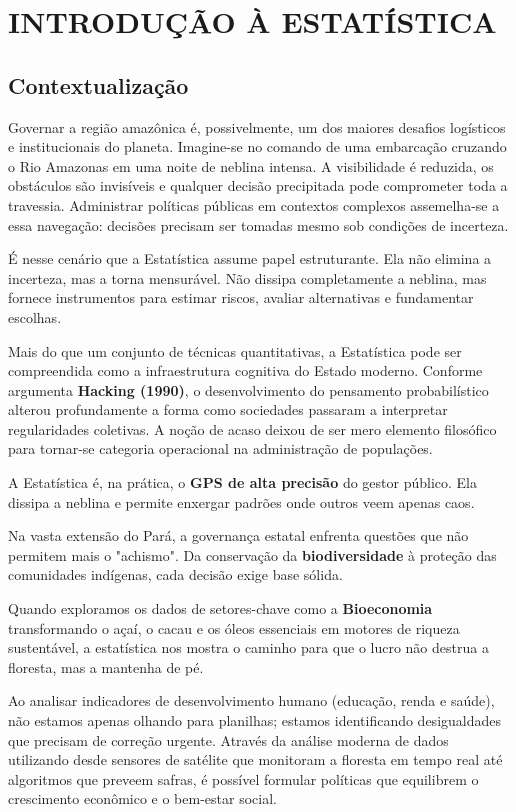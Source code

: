 \chapter{INTRODUÇÃO À ESTATÍSTICA}
\section{Contextualização}

Governar a região amazônica é, possivelmente, um dos maiores desafios logísticos e institucionais do planeta. Imagine-se no comando de uma embarcação cruzando o Rio Amazonas em uma noite de neblina intensa. A visibilidade é reduzida, os obstáculos são invisíveis e qualquer decisão precipitada pode comprometer toda a travessia. Administrar políticas públicas em contextos complexos assemelha-se a essa navegação: decisões precisam ser tomadas mesmo sob condições de incerteza. \vskip0.3cm

É nesse cenário que a Estatística assume papel estruturante. Ela não elimina a incerteza, mas a torna mensurável. Não dissipa completamente a neblina, mas fornece instrumentos para estimar riscos, avaliar alternativas e fundamentar escolhas. \vskip0.3cm

Mais do que um conjunto de técnicas quantitativas, a Estatística pode ser compreendida como a infraestrutura cognitiva do Estado moderno. Conforme argumenta \textbf{Hacking (1990)}, o desenvolvimento do pensamento probabilístico alterou profundamente a forma como sociedades passaram a interpretar regularidades coletivas. A noção de acaso deixou de ser mero elemento filosófico para tornar-se categoria operacional na administração de populações. \vskip0.3cm


A Estatística é, na prática, o \textbf{GPS de alta precisão} do gestor público. Ela dissipa a neblina e permite enxergar padrões onde outros veem apenas caos. \vskip0.3cm

Na vasta extensão do Pará, a governança estatal enfrenta questões que não permitem mais o "achismo". Da conservação da \textbf{biodiversidade} à proteção das comunidades indígenas, cada decisão exige base sólida. \vskip0.3cm

\newpage
Quando exploramos os dados de setores-chave como a\textbf{ Bioeconomia} transformando o açaí, o cacau e os óleos essenciais em motores de riqueza sustentável, a estatística nos mostra o caminho para que o lucro não destrua a floresta, mas a mantenha de pé. \vskip0.3cm

Ao analisar indicadores de desenvolvimento humano (educação, renda e saúde), não estamos apenas olhando para planilhas; estamos identificando desigualdades que precisam de correção urgente. Através da análise moderna de dados utilizando desde sensores de satélite que monitoram a floresta em tempo real até algoritmos que preveem safras, é possível formular políticas que equilibrem o crescimento econômico e o bem-estar social.  \vskip0.3cm


